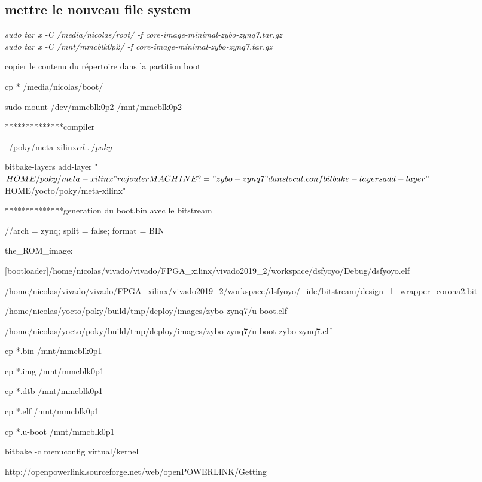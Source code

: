 \subsection{mettre le nouveau file system}


\textit{sudo tar x -C /media/nicolas/root/ -f core-image-minimal-zybo-zynq7.tar.gz}
\\\textit{sudo tar x -C /mnt/mmcblk0p2/ -f core-image-minimal-zybo-zynq7.tar.gz}



copier le contenu du répertoire dans la partition boot

cp * /media/nicolas/boot/

sudo mount /dev/mmcblk0p2 /mnt/mmcblk0p2





**************compiler

~/poky/meta-xilinx$ cd ..

~/poky$

bitbake-layers add-layer "$HOME/poky/meta-xilinx"

rajouter MACHINE ?= "zybo-zynq7" dans local.conf

bitbake-layers add-layer "$HOME/yocto/poky/meta-xilinx"





**************generation du boot.bin avec le bitstream

//arch = zynq; split = false; format = BIN

the_ROM_image:

{

[bootloader]/home/nicolas/vivado/vivado/FPGA_xilinx/vivado2019_2/workspace/dsfyoyo/Debug/dsfyoyo.elf

/home/nicolas/vivado/vivado/FPGA_xilinx/vivado2019_2/workspace/dsfyoyo/_ide/bitstream/design_1_wrapper_corona2.bit

/home/nicolas/yocto/poky/build/tmp/deploy/images/zybo-zynq7/u-boot.elf

/home/nicolas/yocto/poky/build/tmp/deploy/images/zybo-zynq7/u-boot-zybo-zynq7.elf

}





cp *.bin /mnt/mmcblk0p1

cp *.img /mnt/mmcblk0p1

cp *.dtb /mnt/mmcblk0p1

cp *.elf /mnt/mmcblk0p1

cp *.u-boot /mnt/mmcblk0p1



bitbake -c menuconfig virtual/kernel





http://openpowerlink.sourceforge.net/web/openPOWERLINK/Getting%



